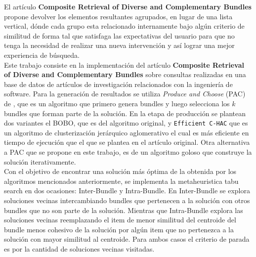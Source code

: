 El artículo \textbf{Composite Retrieval of Diverse and Complementary Bundles}\cite{compositeRetrival} propone devolver los elementos resultantes agrupados, en lugar de una lista vertical, dónde cada grupo esta relacionado internamente bajo algún criterio de similitud de forma tal que satisfaga las expectativas del usuario para que no tenga la necesidad de realizar una nueva intervención y así lograr una mejor experiencia de búsqueda.\\
Este trabajo consiste en la implementación del artículo \textbf{Composite Retrieval of Diverse and Complementary Bundles} sobre consultas realizadas en una base de datos de artículos de investigación relacionados con la ingeniería de software. Para la generación de resultados se utiliza \textit{Produce and Choose} (PAC) de \cite{compositeRetrival}, que es un algoritmo que primero genera bundles y luego selecciona los $k$ bundles que forman parte de la solución. En la etapa de producción se plantean dos variantes el BOBO, que es del algoritmo original, y \texttt{Efficient C-HAC} que es un algoritmo de clusterización jerárquico aglomerativo el cual es más eficiente en tiempo de ejecución que el que se plantea en el artículo original. Otra alternativa a PAC que se propone en este trabajo, es de un algoritmo goloso que construye la solución iterativamente.\\
Con el objetivo de encontrar una solución más óptima de la obtenida por los algoritmos mencionados anteriormente, se implementa la metaheuristica tabu search en dos ocasiones: Inter-Bundle y Intra-Bundle. En Inter-Bundle se explora soluciones vecinas intercambiando bundles que pertenecen a la solución con otros bundles que no son parte de la solución. Mientras que Intra-Bundle explora las soluciones vecinas reemplazando el item de menor similitud del centroide del bundle menos cohesivo de la solución por algún item que no pertenezca a la solución con mayor similitud al centroide. Para ambos casos el criterio de parada es por la cantidad de soluciones vecinas visitadas.\\

